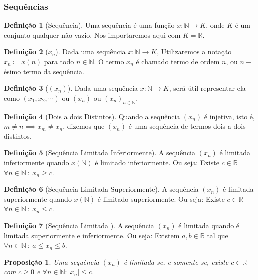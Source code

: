 \documentclass{article}
\newtheorem{prop}{Proposição}[section]
\theoremstyle{theorem}
\theoremstyle{lemma}
\theoremstyle{definition}
\newtheorem{definicao}{Definição}[section]
\theoremstyle{remark}
\begin{document}
   \subsubsection{ Sequências}
   \begin{definicao}[Sequência]
	   Uma sequência é uma função $x: \mathbb{N} \to K$, onde $K$ é um conjunto qualquer não-vazio. Nos importaremos aqui com $K = \mathbb{R}$. 
   \end{definicao}
   \begin{definicao}[$x_n$]
	   Dada uma sequência $x: \mathbb{N} \to K$, Utilizaremos a notação $x_n \coloneqq x(n)$ para todo $n \in \mathbb{N}$. O termo $x_n$ é chamado termo de ordem $n$, ou $n-$ésimo termo da sequência.
   \end{definicao}
   \begin{definicao}[$(x_n)$]
	   Dada uma sequência $x: \mathbb{N} \to K$, será útil representar ela como $(x_1,x_2,\cdots)$ ou $(x_n)$ ou $(x_n)_{n\in \mathbb{N}}$.
   \end{definicao}
   \begin{definicao}[Dois a dois Distintos]
	   Quando a sequência $(x_n)$ é injetiva, isto é, $m\neq n \implies x_m \neq x_n$, dizemos que $(x_n)$ é uma sequência de termos dois a dois distintos.
   \end{definicao}
   \begin{definicao}[Sequência Limitada Inferiormente]
	   A sequência $(x_n)$ é limitada inferiormente quando $x\left(\mathbb{N}\right)$ é limitado inferiormente. Ou seja: Existe $c \in \mathbb{R}$  $\forall n \in \mathbb{N} \: : \:   x_n \geq c$.
   \end{definicao}
   \begin{definicao}[Sequência Limitada Superiormente]
	   A sequência $(x_n)$ é limitada superiormente quando $x\left(\mathbb{N}\right)$ é limitado superiormente. Ou seja: Existe $c \in \mathbb{R}$  $\forall n \in \mathbb{N} \: : \:   x_n \leq c$.
   \end{definicao}
   \begin{definicao}[Sequência Limitada ]
	   A sequência $(x_n)$ é limitada quando é limitada superiormente e inferiormente. Ou seja: Existem $a,b \in \mathbb{R}$ tal que  $\forall n \in \mathbb{N} \: : \:   a \leq x_n \leq b$.
   \end{definicao}
   \begin{prop}
	   Uma sequência $(x_n)$ é limitada se, e somente se, existe $c\in \mathbb{R}$ com $c\geq 0 $ e $ \forall n \in \mathbb{N} : |x_n| \leq c$.
   \end{prop}
\end{document}

